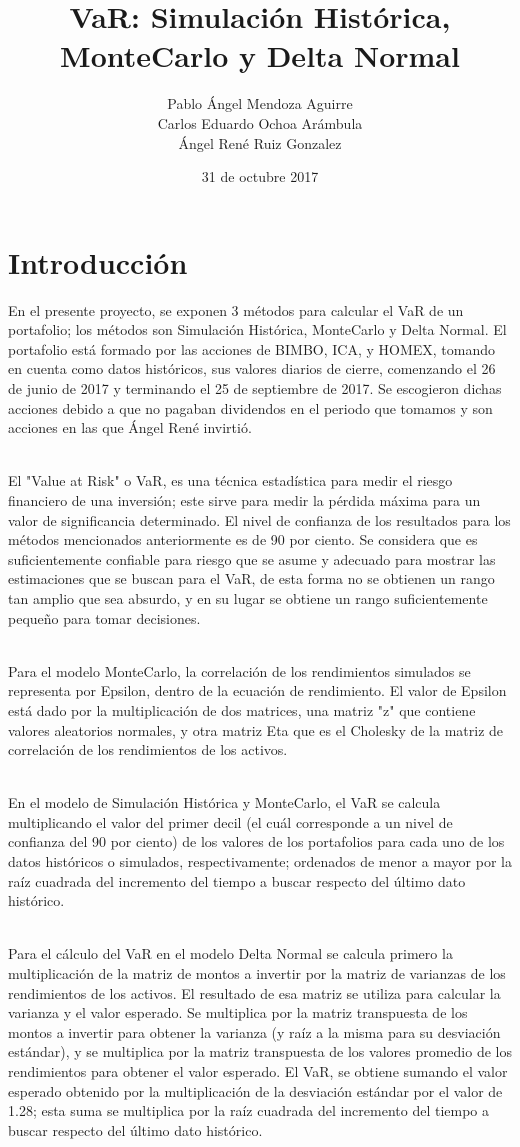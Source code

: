 \documentclass[12pt]{article}
\title{VaR: Simulación Histórica, MonteCarlo y Delta Normal}
\author{Pablo Ángel Mendoza Aguirre\\Carlos Eduardo Ochoa Arámbula\\Ángel René Ruiz Gonzalez }
\date{31 de octubre 2017}
\begin{document}
\maketitle
\section{Introducción}

En el presente proyecto, se exponen 3 métodos para calcular el VaR de un portafolio; los métodos son Simulación Histórica, MonteCarlo y Delta Normal. El portafolio está formado por las acciones de BIMBO, ICA, y HOMEX, tomando en cuenta como datos históricos, sus valores diarios de cierre, comenzando el 26 de junio de 2017 y terminando el 25 de septiembre de 2017. Se escogieron dichas acciones debido a que no pagaban dividendos en el periodo que tomamos y son acciones en las que Ángel René invirtió.

\ \\%
El "Value at Risk" o VaR, es una técnica estadística para medir el riesgo financiero de una inversión; este sirve para medir la pérdida máxima para un valor de significancia determinado. El nivel de confianza de los resultados para los métodos mencionados anteriormente es de 90 por ciento. Se considera que es suficientemente confiable para riesgo que se asume y adecuado para mostrar las estimaciones que se buscan para el VaR, de esta forma no se obtienen un rango tan amplio que sea absurdo, y en su lugar se obtiene un rango suficientemente pequeño para tomar decisiones.

\ \\%
Para el modelo MonteCarlo, la correlación de los rendimientos simulados se representa por Epsilon, dentro de la ecuación de rendimiento. El valor de Epsilon está dado por la multiplicación de dos matrices, una matriz "z" que contiene valores aleatorios normales, y otra matriz Eta que es el Cholesky de la matriz de correlación de los rendimientos de los activos. 

\ \\%
En el modelo de Simulación Histórica y MonteCarlo, el VaR se calcula multiplicando el valor del primer decil (el cuál corresponde a un nivel de confianza del 90 por ciento) de los valores de los portafolios para cada uno de los datos históricos o simulados, respectivamente; ordenados de menor a mayor por la raíz cuadrada del incremento del tiempo a buscar respecto del último dato histórico.

\ \\%
Para el cálculo del VaR en el modelo Delta Normal se calcula primero la multiplicación de la matriz de montos a invertir por la matriz de varianzas de los rendimientos de los activos. 
El resultado de esa matriz se utiliza para calcular la varianza y el valor esperado.
Se multiplica por la matriz transpuesta de los montos a invertir para obtener la varianza (y raíz a la misma para su desviación estándar), y se multiplica por la matriz transpuesta de los valores promedio de los rendimientos para obtener el valor esperado. El VaR, se obtiene sumando el valor esperado obtenido por la multiplicación de la desviación estándar por el valor de 1.28; esta suma se multiplica por la raíz cuadrada del incremento del tiempo a buscar respecto del último dato histórico.
\end{document}
